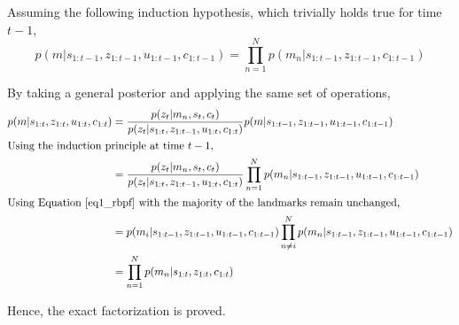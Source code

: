 Assuming the following induction hypothesis, which trivially holds true for time $t-1$,
\begin{equation}
p(m|s_{1:t-1},z_{1:t-1},u_{1:t-1},c_{1:t-1})=\prod_{n=1}^N p(m_n|s_{1:t-1},z_{1:t-1},c_{1:t-1})
\end{equation}

By taking a general posterior and applying the same set of operations,
\begin{align*}
p(m|s_{1:t},z_{1:t},u_{1:t},c_{1:t}) &= \frac{p(z_t|m_n,s_t,c_t)}{p(z_t|s_{1:t},z_{1:t-1},u_{1:t},c_{1:t})}p(m|s_{1:t-1},z_{1:t-1},u_{1:t-1},c_{1:t-1}) \\
\intertext{Using the induction principle at time $t-1$,}
&= \frac{p(z_t|m_n,s_t,c_t)}{p(z_t|s_{1:t},z_{1:t-1},u_{1:t},c_{1:t})}\prod_{n=1}^N p(m_n|s_{1:t-1},z_{1:t-1},u_{1:t-1},c_{1:t-1}) \\
\intertext{Using Equation~\ref{eq1_rbpf} with the majority of the landmarks remain unchanged,}
&= p(m_i|s_{1:t-1},z_{1:t-1},u_{1:t-1},c_{1:t-1})\prod_{n\neq i}^N p(m_n|s_{1:t-1},z_{1:t-1},u_{1:t-1},c_{1:t-1}) \\
&= \prod_{n=1}^N p(m_n|s_{1:t},z_{1:t},c_{1:t})
\end{align*}

Hence, the exact factorization is proved.